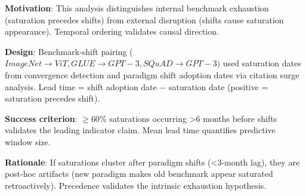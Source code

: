 
\textbf{Motivation}: This analysis distinguishes internal benchmark exhaustion (saturation precedes shifts) from external disruption (shifts cause saturation appearance). Temporal ordering validates causal direction.

\textbf{Design}: Benchmark-shift pairing ($ImageNet\rightarrow ViT, GLUE\rightarrow GPT-3, SQuAD\rightarrow GPT-3)$ used saturation dates from convergence detection and paradigm shift adoption dates via citation surge analysis. Lead time = shift adoption date $-$ saturation date (positive = saturation precedes shift).

\textbf{Success criterion}: $\geq 60$\% saturations occurring >6 months before shifts validates the leading indicator claim. Mean lead time quantifies predictive window size.

\textbf{Rationale}: If saturations cluster after paradigm shifts (<3-month lag), they are post-hoc artifacts (new paradigm makes old benchmark appear saturated retroactively). Precedence validates the intrinsic exhaustion hypothesis.
